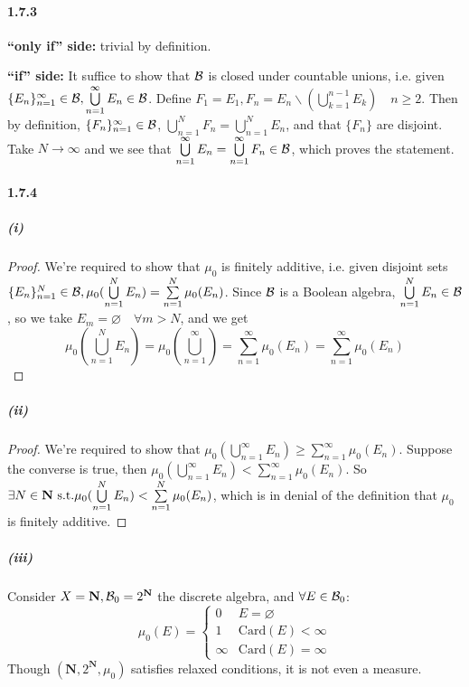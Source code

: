 \documentclass{article}
\begin{document}
\paragraph{1.7.3}
\textbf{``only if'' side: } trivial by definition.

\textbf{``if'' side: } It suffice to show that $\mathcal{B}$ is closed under countable unions, i.e. given $\{E_n\}_{n=1}^\infty\in\mathcal{B}, \bigcup\limits_{n=1}^{\infty}E_n\in \mathcal{B}$. Define $F_1=E_1, F_n=E_n\backslash (\bigcup\limits_{k=1}^{n-1}E_k)\quad n\geq 2$. Then by definition, $\{F_n\}_{n=1}^{\infty}\in\mathcal{B}$, $\bigcup\limits_{n=1}^{N}F_n=\bigcup\limits_{n=1}^N E_n$, and that $\{F_n\}$ are disjoint. Take $N\to\infty$ and we see that $\bigcup\limits_{n=1}^{\infty}E_n=\bigcup\limits_{n=1}^\infty F_n\in \mathcal{B}$, which proves the statement.

\paragraph{1.7.4}
\subparagraph{(i)}
\begin{proof}We're required to show that $\mu_0$ is finitely additive, i.e. given disjoint sets $\{E_n\}_{n=1}^N\in\mathcal{B}, \mu_0(\bigcup\limits_{n=1}^{N}E_n)=\sum\limits_{n=1}^N \mu_0(E_n)$. Since $\mathcal{B}$ is a Boolean algebra, $\bigcup\limits_{n=1}^{N}E_n\in \mathcal{B}$, so we take $E_m=\varnothing\quad \forall m>N$, and we get 
\[\mu_0(\bigcup_{n=1}^N E_n)=\mu_0(\bigcup_{n=1}^{\infty})=\sum_{n=1}^\infty\mu_0(E_n)=\sum_{n=1}^\infty\mu_0(E_n)\]\end{proof}
\subparagraph{(ii)}
\begin{proof}
We're required to show that $\mu_0(\bigcup\limits_{n=1}^\infty E_n)\geq \sum\limits_{n=1}^{\infty}\mu_0(E_n)$. Suppose the converse is true, then $\mu_0(\bigcup\limits_{n=1}^\infty E_n)< \sum\limits_{n=1}^{\infty}\mu_0(E_n)$. So $\exists N\in\mathbf{N}\text{ s.t.} \mu_0(\bigcup\limits_{n=1}^N E_n)<\sum\limits_{n=1}^N \mu_0(E_n)$, which is in denial of the definition that $\mu_0$ is finitely additive.
\end{proof}
\subparagraph{(iii)}
Consider $X=\mathbf{N}, \mathcal{B}_0=2^{\mathbf{N}}$ the discrete algebra, and $\forall E\in\mathcal{B}_0$:
\[\mu_0(E)=\begin{cases}
0 &E=\varnothing\\
1 &\mathrm{Card}(E)<\infty\\
\infty &\mathrm{Card}(E)=\infty
\end{cases}\]
Though $(\mathbf{N},2^{\mathbf{N}},\mu_0)$ satisfies relaxed conditions, it is not even a measure.
\end{document}
